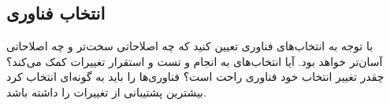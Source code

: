 \subsection{انتخاب فناوری}
با توجه به انتخاب‌های فناوری تعیین کنید که چه اصلاحاتی سخت‌تر و چه اصلاحاتی آسان‌تر خواهد بود. 
آیا انتخاب‌های به انجام و تست و استقرار تغییرات کمک‌ می‌کند؟
چقدر تغییر انتخاب خود فناوری راحت است؟ فناوری‌ها را باید به گونه‌ای انتخاب کرد بیشترین پشتیبانی از تغییرات را داشته باشد.




